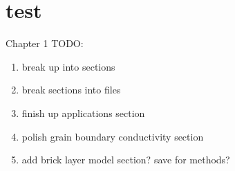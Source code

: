 \section{test}
Chapter 1 TODO:

\begin{enumerate}
    \item break up into sections
    \item break sections into files
    \item finish up applications section
    \item polish grain boundary conductivity section
    \item add brick layer model section? save for methods?
\end{enumerate}











